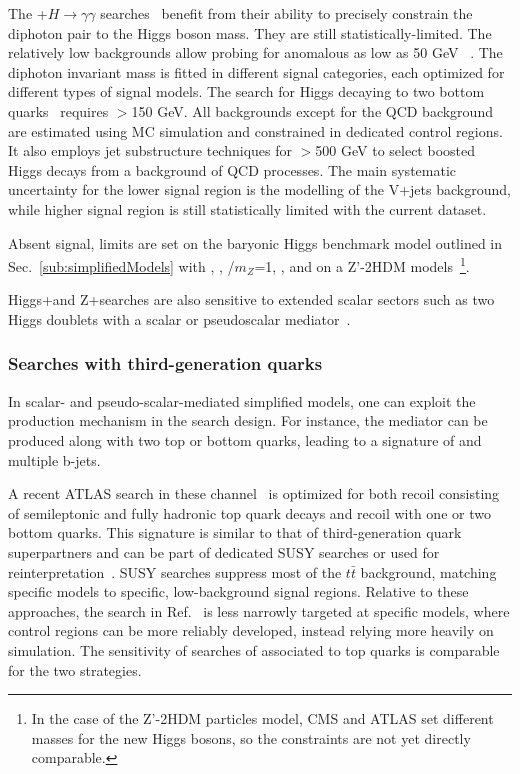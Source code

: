 The \MET+$H \rightarrow \gamma\gamma$ searches~\cite{CMS-PAS-EXO-16-054,Aaboud:2017uak} benefit from their ability to precisely constrain the diphoton pair to the Higgs boson mass.
They are still statistically-limited.
The relatively low backgrounds allow probing for anomalous \MET as low as 50 GeV~\cite{CMS-PAS-EXO-16-054} .
The diphoton invariant mass is fitted in different signal categories, each optimized for different types of signal models.
The search for Higgs decaying to two bottom quarks~\cite{Aaboud:2017yqz} requires \MET$>$150 GeV. All backgrounds except for the QCD background are estimated using MC simulation and constrained in dedicated control regions. 
It also employs jet substructure techniques for \MET$>$500 GeV to select boosted Higgs decays from a background of QCD processes.
The main systematic uncertainty for the lower \MET signal region is the modelling of the V+jets background, while higher \MET signal region is still statistically limited with the current dataset.

Absent signal, limits are set on the baryonic Higgs benchmark model outlined in Sec.~\ref{sub:simplifiedModels} with  , , \ghZprimeZprime/$m_{Z}$=1, , 
and on a Z'-2HDM models~\footnote{ In the case of the Z'-2HDM particles model, CMS and ATLAS set different masses for the new Higgs bosons, 
so the constraints are not yet directly comparable.}.

Higgs+\MET and Z+\MET searches are also sensitive to extended scalar sectors such as two Higgs doublets with a scalar or pseudoscalar mediator~\cite{Bauer:2017ota,Goncalves:2016iyg,Bell:2016ekl}.

\subsubsection{Searches with third-generation quarks}

In scalar- and pseudo-scalar-mediated simplified models, one can exploit the production mechanism in the search design. For instance, the mediator can be produced along with two top or bottom quarks, leading to a signature of \MET and multiple b-jets.

A recent ATLAS search in these channel~\cite{Aaboud:2017rzf} is optimized for both recoil consisting of semileptonic and fully hadronic top quark decays and recoil with one or two bottom quarks.
This signature is similar to that of third-generation quark superpartners and can be part of dedicated SUSY searches or used for reinterpretation~\cite{Aaboud:2017aeu,Sirunyan:2017leh}.
SUSY searches suppress most of the $t\bar{t}$ background, matching specific models to specific, low-background signal regions. 
Relative to these approaches, the search in Ref.~\cite{Aaboud:2017rzf} is less narrowly targeted at specific models, where control regions can be more reliably developed, instead relying more heavily on simulation.
The sensitivity of searches of \MET associated to top quarks is comparable for the two strategies. 

